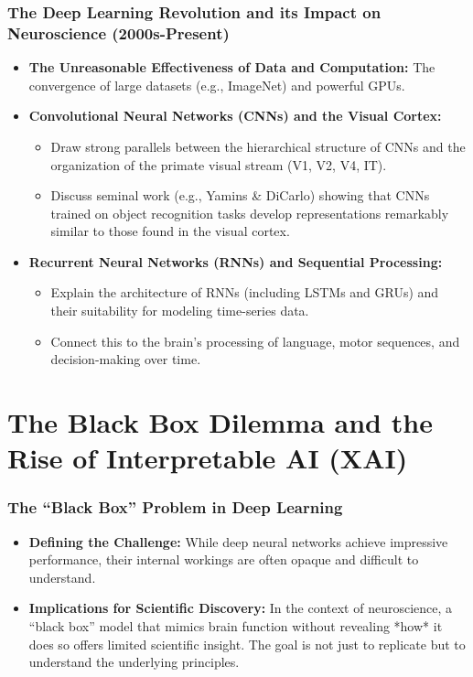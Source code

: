 \documentclass[11pt,a4paper]{article}
\begin{document}
\section{The Deep Learning Revolution and its Impact on Neuroscience (2000s-Present)}
\begin{itemize}
    \item \textbf{The Unreasonable Effectiveness of Data and Computation:} The convergence of large datasets (e.g., ImageNet) and powerful GPUs.
    \item \textbf{Convolutional Neural Networks (CNNs) and the Visual Cortex:}
        \begin{itemize}
            \item Draw strong parallels between the hierarchical structure of CNNs and the organization of the primate visual stream (V1, V2, V4, IT).
            \item Discuss seminal work (e.g., Yamins \& DiCarlo) showing that CNNs trained on object recognition tasks develop representations remarkably similar to those found in the visual cortex.
        \end{itemize}
    \item \textbf{Recurrent Neural Networks (RNNs) and Sequential Processing:}
        \begin{itemize}
            \item Explain the architecture of RNNs (including LSTMs and GRUs) and their suitability for modeling time-series data.
            \item Connect this to the brain's processing of language, motor sequences, and decision-making over time.
        \end{itemize}
\end{itemize}

\clearpage

\part{The Black Box Dilemma and the Rise of Interpretable AI (XAI)}

\section{The ``Black Box'' Problem in Deep Learning}
\begin{itemize}
    \item \textbf{Defining the Challenge:} While deep neural networks achieve impressive performance, their internal workings are often opaque and difficult to understand.
    \item \textbf{Implications for Scientific Discovery:} In the context of neuroscience, a ``black box'' model that mimics brain function without revealing *how* it does so offers limited scientific insight. The goal is not just to replicate but to understand the underlying principles.
\end{itemize}
\end{document}
